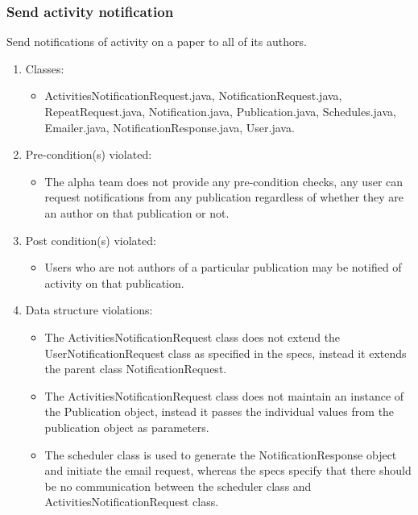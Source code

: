 \subsubsection*{Send activity notification}
Send notifications of activity on a paper to all of its authors.
\begin{enumerate}
	\item Classes: 
		\begin{itemize}
			\item ActivitiesNotificationRequest.java, NotificationRequest.java, RepeatRequest.java, Notification.java, 								Publication.java, Schedules.java, Emailer.java, NotificationResponse.java, User.java.
		\end{itemize}
	\item Pre-condition(s) violated: 
		\begin{itemize}
			\item The alpha team does not provide any pre-condition checks, any user can request notifications from any 							publication regardless of whether they are an author on that publication or not. 
		\end{itemize}
	\item Post condition(s) violated: 
		\begin{itemize}
			\item Users who are not authors of a particular publication may be notified of activity on that publication.
		\end{itemize}
	\item Data structure violations:
	\begin{itemize}
		\item The ActivitiesNotificationRequest class does not extend the UserNotificationRequest class as specified in the 					specs, instead it extends the parent class NotificationRequest.
		\item The ActivitiesNotificationRequest class does not maintain an instance of the Publication object, instead it passes 				the individual values from the publication object as parameters.
		\item The scheduler class is used to generate the NotificationResponse object and initiate the email request, whereas the 			specs specify that there should be no communication between the scheduler class and ActivitiesNotificationRequest 					class.
	\end{itemize}
\end{enumerate}
\newpage

